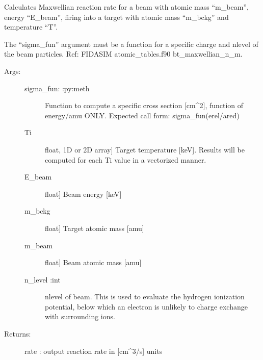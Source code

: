 \documentclass[letterpaper,10pt,english]{sphinxmanual}
\begin{document}
\begin{fulllineitems}
\label{\detokenize{aurora:aurora.nbi_neutrals.bt_rate_maxwell_average}}
Calculates Maxwellian reaction rate for a beam with atomic mass “m\_beam”, 
energy “E\_beam”, firing into a target with atomic mass “m\_bckg” and temperature “T”.

The “sigma\_fun” argument must be a function for a specific charge and n\sphinxhyphen{}level of the beam particles.
Ref: FIDASIM atomic\_tables.f90 bt\_maxwellian\_n\_m.
\begin{description}
\item[{Args:}] \leavevmode\begin{description}
\item[{sigma\_fun: :py:meth}] \leavevmode
Function to compute a specific cross section {[}cm\textasciicircum{}2{]}, function of energy/amu ONLY.
Expected call form: sigma\_fun(erel/ared)

\item[{Ti}] \leavevmode{[}float, 1D or 2D array{]}
Target temperature {[}keV{]}. Results will be computed for each Ti value in a vectorized manner.

\item[{E\_beam}] \leavevmode{[}float{]}
Beam energy {[}keV{]}

\item[{m\_bckg}] \leavevmode{[}float{]}
Target atomic mass {[}amu{]}

\item[{m\_beam}] \leavevmode{[}float{]}
Beam atomic mass {[}amu{]}

\item[{n\_level :int}] \leavevmode
n\sphinxhyphen{}level of beam. This is used to evaluate the hydrogen ionization potential,
below which an electron is unlikely to charge exchange with surrounding ions.

\end{description}

\item[{Returns:}] \leavevmode
rate : output reaction rate in {[}cm\textasciicircum{}3/s{]} units

\end{description}

\end{fulllineitems}
\end{document}
